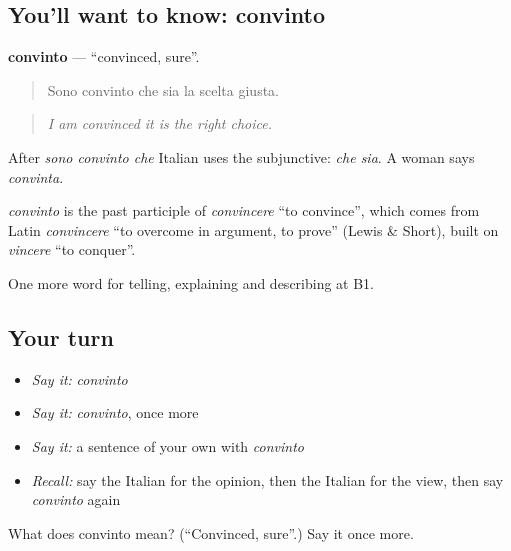 \subsection*{You'll want to know: convinto}
\textbf{convinto} — \textquotedblleft{}convinced, sure\textquotedblright{}.

\begin{quote}
Sono convinto che sia la scelta giusta.
\end{quote}

\begin{quote}
\emph{I am convinced it is the right choice.}
\end{quote}

After \emph{sono convinto che} Italian uses the subjunctive: \emph{che sia}. A woman says \emph{convinta}.

\begin{cousinweb}
\emph{convinto} is the past participle of \emph{convincere} \textquotedblleft{}to convince\textquotedblright{}, which comes from Latin \emph{convincere} \textquotedblleft{}to overcome in argument, to prove\textquotedblright{} (Lewis \& Short), built on \emph{vincere} \textquotedblleft{}to conquer\textquotedblright{}.
\end{cousinweb}

\begin{grammarlens}[title={What you've built}]
One more word for telling, explaining and describing at B1.
\end{grammarlens}

\subsection*{Your turn}
\begin{itemize}
\raggedright
  \item \emph{Say it:} \emph{convinto}
  \item \emph{Say it:} \emph{convinto}, once more
  \item \emph{Say it:} a sentence of your own with \emph{convinto}
  \item \emph{Recall:} say the Italian for the opinion, then the Italian for the view, then say \emph{convinto} again
\end{itemize}

\begin{tcolorbox}[breakable,colback=teal!4,colframe=teal!35!black,title={Before you move on}]
What does convinto mean? (\textquotedblleft{}Convinced, sure\textquotedblright{}.) Say it once more.
\end{tcolorbox}
